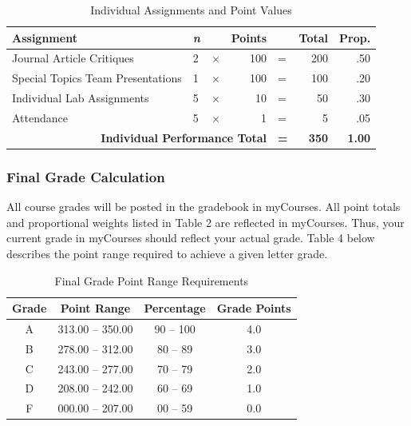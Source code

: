 \documentclass[
]{article}
\begin{document}
\begin{table}[H]
\centering
\caption{Individual Assignments and Point Values}
\vspace{3mm}
\label{points}
\begin{tabular}{lllrlrr}
\hline
\bf{Assignment} & \bf{\em{n}} &  & \bf{Points} &  & \bf{Total} & \bf{Prop.} \\
\hline
Journal Article Critiques & 2 & $\times$ & 100 & = & 200 & .50\\
Special Topics Team Presentations & 1 & $\times$ & 100 & = & 100 & .20\\
Individual Lab Assignments & 5 & $\times$ & 10 & = & 50 & .30 \\
Attendance & 5 & $\times$ & 1 & = & 5 & .05 \\
\multicolumn{4}{r}{\bf{Individual Performance Total}} & {\bf{=}} & {\bf{350}} & {\bf{1.00}} \\
\hline
\end{tabular}
\label{points}
\end{table}

\subsubsection{Final Grade Calculation}

All course grades will be posted in the gradebook in myCourses. All
point totals and proportional weights listed in Table 2 are reflected in
myCourses. Thus, your current grade in myCourses should reflect your
actual grade. Table 4 below describes the point range required to
achieve a given letter grade.

\begin{table}[H]
\begin{center}
\caption{Final Grade Point Range Requirements}
\label{finalgrades}
\vspace{3mm}
\begin{tabular}{cccc}
\hline
\bf{Grade} & \bf{Point Range} & \bf{Percentage} & \bf{Grade Points}\\
\hline
A & 313.00 -- 350.00 & 90 -- 100 & 4.0\\ 
B & 278.00 -- 312.00 & 80 -- 89  & 3.0\\ 
C & 243.00 -- 277.00 & 70 -- 79  & 2.0\\ 
D & 208.00 -- 242.00 & 60 -- 69  & 1.0\\ 
F & 000.00 -- 207.00 & 00 -- 59  & 0.0\\
\hline
\end{tabular}
\end{center}
\end{table}
\end{document}
